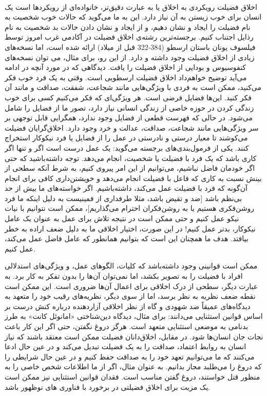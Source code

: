 \paragraph{}
اخلاق فضیلت رویکردی به اخلاق یا به عبارت دقیق‌تر، خانواده‌ای از رویکردها است یک انسان برای خوب زیستن به آن نیاز دارد.
این به ما می‌گوید که حالات خوب شخصیت به نام فضیلت را ایجاد و نشان دهیم، و از ایجاد و نشان دادن حالات بد شخصیت به نام رذایل اجتناب کنیم.
برجسته‌ترین رشته‌ی اخلاق فضیلت در آکادمی غرب امروز توسط فیلسوف یونان باستان ارسطو (384-322 قبل از میلاد) ارائه شده است، اما نسخه‌های زیادی از اخلاق فضیلت وجود داشته و دارد.
از این رو، برای مثال، می توان نسخه‌های کنفوسیوس و بودایی از اخلاق فضیلت را یافت.
دیدگاهی که در مورد آنچه در ادامه می‌آید توضیح خواهم‌داد اخلاق فضیلت ارسطویی است.
وقتی به یک فرد خوب فکر می‌کنید، ممکن است به فردی با ویژگی‌هایی مانند شجاعت، شفقت، صداقت و مانند آن فکر کنید.
این‌ها فضایل فرضی است.
هر ویژگی‌ای که فکر می‌کنیم کسی برای خوب زندگی کردن در حوزه خاصی از زندگی انسانی نیاز دارد، تصور ما از فضایل را شامل می‌شود.
در حالی که فهرست قطعی از فضایل وجود ندارد، همگرایی قابل توجهی بر سر ویژگی‌هایی مانند شجاعت، صداقت، عدالت و خرد وجود دارد.
اخلاق‌گرایان فضیلت می‌کوشند تا معیار درستی و نادرستی در عمل را از فضایل یا فرد نیکوکار استخراج کنند.
یکی از فرمول‌بندی‌های برجسته می‌گوید: یک عمل درست است اگر و تنها اگر کاری باشد که یک فرد با فضیلت یا شخصیت، انجام می‌دهد.
توجه داشته‌باشید که حتی اگر خودمان فاضل نباشیم، می‌توانیم از این امر پیروی کنیم، به شرط آنکه سطحی از بینش نسبت به کاری که فاعل با فضیلت انجام می‌دهد و خویشتن‌داری کافی برای انجام آن‌گونه که فرد با فضیلت عمل می‌کند، داشته‌باشیم.
اگر خواسته‌های ما بیش از حد بی‌نظم باشد [ضد و تقیض باشد، مثلا طرفداری از فمینیست به دلیل اینکه ما فرد روشن‌فکری هستیم یا به روشن‌فکران احترام می‌گذاریم]، ممکن است نتوانیم با نیات نیکو عمل کنیم و حتی ممکن است در نتیجه تلاش برای عمل به عنوان یک عامل نیکوکار، بدتر عمل کنیم!
در این صورت، اختیار اخلاقی ما به دلیل ضعف اراده به خطر بیافتد.
هدف ما همچنان این است که بتوانیم همانطور که عامل فاضل عمل می‌کند، عمل کنیم.

ممکن است قوانینی وجود داشته‌باشد که کلیات، الگوهای عمل، و ویژگی‌های استدلالی افراد با فضیلت را به تصویر بکشد، اما نمی‌توان آن‌ها را بدون تفکر به کار برد.
به عبارت دیگر، سطحی از درک اخلاقی برای اعمال آن‌ها ضروری است.
این ممکن است نقطه ضعف نظریه به نظر برسد، اما از سوی دیگر، نظریه‌های رقیب خود را متعهد به دیدگاه‌های عمیقاً ضد شهودی و گاه از نظر اخلاقی آزاردهنده درباره کنش درست بر اساس قوانین استثنایی می‌دانند: برای مثال، دیدگاه دین‌شناختی «امانوئل کانت» به طرز بدنامی به موضعی استثنایی متعهد است.
هرگز دروغ نگفتن، حتی اگر این کار باعث نجات جان انسان‌ها شود.
در مقابل، اخلاق‌دانان فضیلت ممکن است معتقد باشند که نیاز انسان به روابط اعتماد، صداقت را به یک فضیلت تبدیل می‌کند و در عین حال ادعا می‌کنند که ما می‌توانیم تعهد خود را به صداقت حفظ کنیم و در عین حال شرایطی را که دروغ را می‌طلبد مجاز بدانیم.
به عنوان مثال، اگر از ما اطلاعات شخص خاصی را به منظور قتل خواستند، دروغ گفتن مناسب است.
فقدان قوانین استثنایی نیز ممکن است یک مزیت برای اخلاق فضیلتی در برخورد با فناوری های نوظهور باشد.


